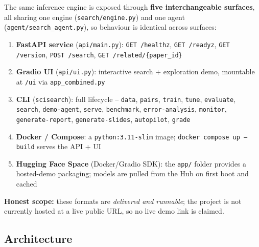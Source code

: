 \documentclass[12pt,a4paper]{article}
\begin{document}
The same inference engine is exposed through \textbf{five interchangeable surfaces}, all sharing one engine (\texttt{search/engine.py}) and one agent (\texttt{agent/search\_agent.py}), so behaviour is identical across surfaces:
\begin{enumerate}
  \item \textbf{FastAPI service} (\texttt{api/main.py}): \texttt{GET /healthz}, \texttt{GET /readyz}, \texttt{GET /version}, \texttt{POST /search}, \texttt{GET /related/\{paper\_id\}}
  \item \textbf{Gradio UI} (\texttt{api/ui.py}): interactive search + exploration demo, mountable at \texttt{/ui} via \texttt{app\_combined.py}
  \item \textbf{CLI} (\texttt{scisearch}): full lifecycle -- \texttt{data}, \texttt{pairs}, \texttt{train}, \texttt{tune}, \texttt{evaluate}, \texttt{search}, \texttt{demo-agent}, \texttt{serve}, \texttt{benchmark}, \texttt{error-analysis}, \texttt{monitor}, \texttt{generate-report}, \texttt{generate-slides}, \texttt{autopilot}, \texttt{grade}
  \item \textbf{Docker / Compose}: a \texttt{python:3.11-slim} image; \texttt{docker compose up --build} serves the API + UI
  \item \textbf{Hugging Face Space} (Docker/Gradio SDK): the \texttt{app/} folder provides a hosted-demo packaging; models are pulled from the Hub on first boot and cached
\end{enumerate}

\textbf{Honest scope:} these formats are \emph{delivered and runnable}; the project is not currently hosted at a live public URL, so no live demo link is claimed.

\subsection{Architecture}
\end{document}
